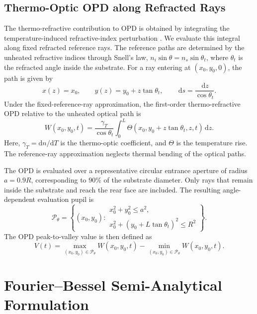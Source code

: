 \documentclass{optica-article}
\newcommand{\dd}{\,\mathrm{d}}
\begin{document}
\NominalTable

\subsection{Thermo-Optic OPD along Refracted Rays}
The thermo-refractive contribution to OPD is obtained by integrating the temperature-induced refractive-index perturbation \cite{hellovinet1990,malacarne2012}.
We evaluate this integral along fixed refracted reference rays.
The reference paths are determined by the unheated refractive indices through Snell's law, $n_i\sin\theta=n_s\sin\theta_t$, where $\theta_t$ is the refracted angle inside the substrate.
For a ray entering at $(x_0,y_0,0)$, the path is given by
\begin{equation}
 x(z)=x_0,\qquad
 y(z)=y_0+z\tan\theta_t,\qquad
 \dd s=\frac{\dd z}{\cos\theta_t}.
 \label{eq:ray}
\end{equation}
Under the fixed-reference-ray approximation, the first-order thermo-refractive OPD relative to the unheated optical path is
\begin{equation}
 W(x_0,y_0,t)
 =
 \frac{\gamma_T}{\cos\theta_t}
 \int_0^L
 \Theta(x_0,y_0+z\tan\theta_t,z,t)\dd z.
 \label{eq:opd}
\end{equation}
Here, $\gamma_T=\mathrm dn/\mathrm dT$ is the thermo-optic coefficient, and $\Theta$ is the temperature rise.
The reference-ray approximation neglects thermal bending of the optical paths.

The OPD is evaluated over a representative circular entrance aperture of radius $a=0.9R$, corresponding to $90\%$ of the substrate diameter.
Only rays that remain inside the substrate and reach the rear face are included.
The resulting angle-dependent evaluation pupil is
\begin{equation}
 \mathcal P_\theta=
 \left\{
 (x_0,y_0):
 \begin{array}{l}
 x_0^2+y_0^2\le a^2,\\
 x_0^2+(y_0+L\tan\theta_t)^2\le R^2
 \end{array}
 \right\}.
 \label{eq:pupil}
\end{equation}
The OPD peak-to-valley value is then defined as
\begin{equation}
 V(t)=
 \max_{(x_0,y_0)\in\mathcal P_\theta}W(x_0,y_0,t)
 -
 \min_{(x_0,y_0)\in\mathcal P_\theta}W(x_0,y_0,t).
 \label{eq:pv}
\end{equation}

\section{Fourier--Bessel Semi-Analytical Formulation}
\end{document}
